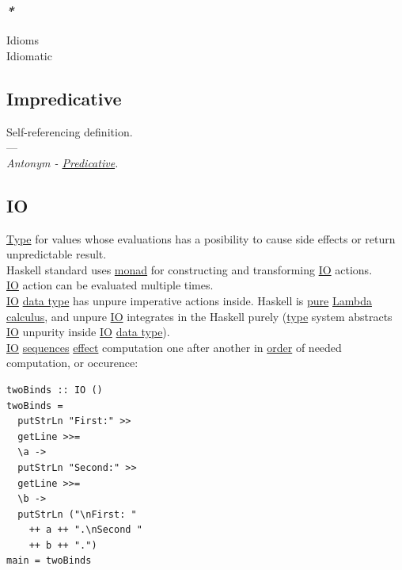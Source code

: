 \documentclass[11pt]{article}
\begin{document}
\subsubsection{\emph{*}}
\label{sec:org4d527ec}

\label{orgb689664}Idioms\\
\label{orgcf367d9}Idiomatic\\

\subsection{\label{org989a83a}Impredicative}
\label{sec:orgb38c4b0}
Self-referencing definition.\\

---\\

\emph{Antonym - \hyperref[org7b6223b]{Predicative}.}\\

\subsection{\label{orga8c8a87}IO}
\label{sec:org673c75f}
\hyperref[orgc4aea2f]{Type} for values whose evaluations has a posibility to cause side effects or return unpredictable result.\\
Haskell standard uses \hyperref[org86a5d95]{monad} for constructing and transforming \hyperref[orga8c8a87]{IO} actions.\\
\hyperref[orga8c8a87]{IO} action can be evaluated multiple times.\\

\hyperref[orga8c8a87]{IO} \hyperref[org212d9c3]{data type} has unpure imperative actions inside. Haskell is \hyperref[org1bf8e16]{pure} \hyperref[org37da5f9]{Lambda calculus}, and unpure \hyperref[orga8c8a87]{IO} integrates in the Haskell purely (\hyperref[orgc4aea2f]{type} system abstracts \hyperref[orga8c8a87]{IO} unpurity inside \hyperref[orga8c8a87]{IO} \hyperref[org212d9c3]{data type}).\\

\hyperref[orga8c8a87]{IO} \hyperref[orga383401]{sequences} \hyperref[orgc34399c]{effect} computation one after another in \hyperref[orgc0a359b]{order} of needed computation, or occurence:\\

\begin{verbatim}
twoBinds :: IO ()
twoBinds =
  putStrLn "First:" >>
  getLine >>=
  \a ->
  putStrLn "Second:" >>
  getLine >>=
  \b ->
  putStrLn ("\nFirst: "
    ++ a ++ ".\nSecond "
    ++ b ++ ".")
main = twoBinds
\end{verbatim}
\end{document}
